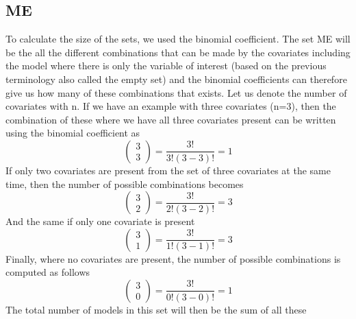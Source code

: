 \subsection{ME}

To calculate the size of the sets, we used the binomial coefficient. The set ME will be the all the different combinations that can be made by the covariates including the model where there is only the variable of interest (based on the previous terminology also called the empty set) and the binomial coefficients can therefore give us how many of these combinations that exists. Let us denote the number of covariates with n. If we have an example with three covariates (n=3), then the combination of these where we have all three covariates present can be written using the binomial coefficient as
\[\left( \begin{array}{c}
3 \\ 
3 \end{array}
\right)=\frac{3!}{3!\left(3-3\right)!}=1\]
If only two covariates are present from the set of three covariates at the same time, then the number of possible combinations becomes 
\[\left( \begin{array}{c}
3 \\ 
2 \end{array}
\right)=\frac{3!}{2!\left(3-2\right)!}=3\] 
And the same if only one covariate is present
\[\left( \begin{array}{c}
3 \\ 
1 \end{array}
\right)=\frac{3!}{1!\left(3-1\right)!}=3\] 
Finally, where no covariates are present, the number of possible combinations is computed as follows
\[\left( \begin{array}{c}
3 \\ 
0 \end{array}
\right)=\frac{3!}{0!\left(3-0\right)!}=1\] 
The total number of models in this set will then be the sum of all these


